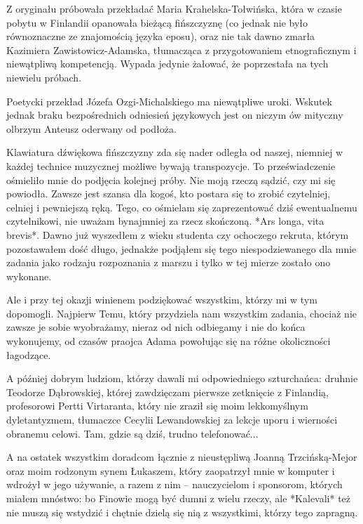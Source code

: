 Z oryginału próbowała przekładać Maria Krahelska-Tołwińska, która w czasie pobytu w Finlandii opanowała bieżącą fińszczyznę (co jednak nie było równoznaczne ze znajomością języka eposu), oraz nie tak dawno zmarła Kazimiera Zawistowicz-Adamska, tłumacząca z przygotowaniem etnograficznym i niewątpliwą kompetencją. Wypada jedynie żałować, że poprzestała na tych niewielu próbach.

Poetycki przekład Józefa Ozgi-Michalskiego ma niewątpliwe uroki. Wskutek jednak braku bezpośrednich odniesień językowych jest on niczym ów mityczny olbrzym Anteusz oderwany od podłoża.

Klawiatura dźwiękowa fińszczyzny zda się nader odległa od naszej, niemniej w każdej technice muzycznej możliwe bywają transpozycje. To przeświadczenie ośmieliło mnie do podjęcia kolejnej próby. Nie moją rzeczą sądzić, czy mi się powiodła. Zawsze jest szansa dla kogoś, kto postara się to zrobić czytelniej, celniej i pewniejszą ręką. Tego, co ośmielam się zaprezentować dziś ewentualnemu czytelnikowi, nie uważam bynajmniej za rzecz skończoną. *Ars longa, vita brevis*. Dawno już wyszedłem z wieku studenta czy ochoczego rekruta, którym pozostawałem dość długo, jednakże podjąłem się tego niespodziewanego dla mnie zadania jako rodzaju rozpoznania z marszu i tylko w tej mierze zostało ono wykonane.

Ale i przy tej okazji winienem podziękować wszystkim, którzy mi w tym dopomogli. Najpierw Temu, który przydziela nam wszystkim zadania, chociaż nie zawsze je sobie wyobrażamy, nieraz od nich odbiegamy i nie do końca wykonujemy, od czasów praojca Adama powołując się na różne okoliczności łagodzące.

A później dobrym ludziom, którzy dawali mi odpowiedniego szturchańca: druhnie Teodorze Dąbrowskiej, której zawdzięczam pierwsze zetknięcie z Finlandią, profesorowi Pertti Virtaranta, który nie zraził się moim lekkomyślnym dyletantyzmem, tłumaczce Cecylii Lewandowskiej za lekcje uporu i wierności obranemu celowi. Tam, gdzie są dziś, trudno telefonować...

A na ostatek wszystkim doradcom łącznie z nieustępliwą Joanną Trzcińską-Mejor oraz moim rodzonym synem Łukaszem, który zaopatrzył mnie w komputer i wdrożył w jego używanie, a razem z nim -- nauczycielom i sponsorom, których miałem mnóstwo: bo Finowie mogą być dumni z wielu rzeczy, ale *Kalevali* też nie muszą się wstydzić i chętnie dzielą się nią z wszystkimi, którzy tego zapragną.